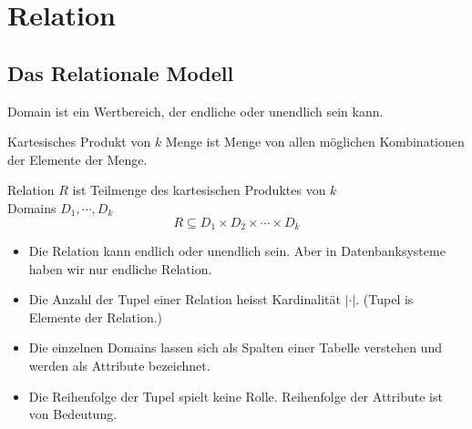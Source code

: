 
\section{Relation}
\subsection{Das Relationale Modell}
\begin{definition}[Domain]
    Domain ist ein Wertbereich, der endliche oder unendlich sein kann.
\end{definition}

\begin{definition}
    Kartesisches Produkt von $k$ Menge ist Menge von allen m\"oglichen Kombinationen der Elemente der Menge.
\end{definition}

\begin{definition}[Relation]
    Relation $R$  ist Teilmenge des kartesischen Produktes von $k$\\ Domains $D_1,\cdots, D_k$ \[R\subseteq D_1\times D_2 \times\cdots \times D_k\]
\end{definition}
\begin{remark}
    \begin{itemize}
        \item Die Relation kann endlich oder unendlich sein. Aber in Datenbanksysteme haben wir nur endliche Relation.
        \item Die Anzahl der Tupel einer Relation heisst Kardinalit\"at $|\cdot|$. (Tupel is Elemente der Relation.)
        \item Die einzelnen Domains lassen sich als Spalten einer Tabelle verstehen und werden als Attribute bezeichnet.
        \item Die Reihenfolge der Tupel spielt keine Rolle. Reihenfolge der Attribute ist von Bedeutung.
    \end{itemize}
\end{remark}


